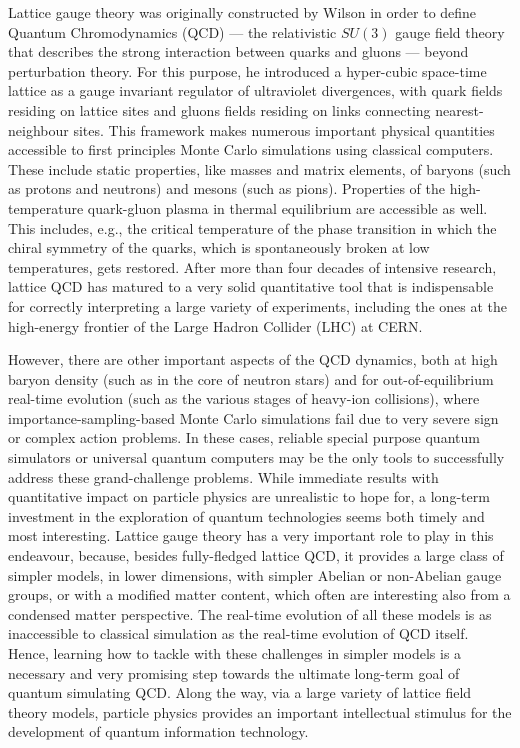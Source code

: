 \documentclass[epj,final]{svjour}
\begin{document}
Lattice gauge theory was originally constructed by Wilson in order to define Quantum Chromodynamics (QCD) --- the relativistic $SU(3)$ gauge field theory that describes the strong interaction between quarks and gluons --- beyond perturbation theory. For this purpose, he introduced a hyper-cubic space-time lattice as a gauge invariant regulator of ultraviolet divergences, with quark fields residing on lattice sites and gluons fields residing on links connecting nearest-neighbour sites. This framework makes numerous important physical quantities accessible to first principles Monte Carlo simulations using classical computers. These include static properties, like masses and matrix elements, of baryons (such as protons and neutrons) and mesons (such as pions). Properties of the high-temperature quark-gluon plasma in thermal equilibrium are accessible as well. This includes, e.g., the critical temperature of the phase transition in which the chiral symmetry of the quarks, which is spontaneously broken at low temperatures, gets restored. After more than four decades of intensive research, lattice QCD has matured to a very solid quantitative tool that is indispensable for correctly interpreting a large variety of experiments, including the ones at the high-energy frontier of the Large Hadron Collider (LHC) at CERN. 

However, there are other important aspects of the QCD dynamics, both at high baryon density (such as in the core of neutron stars) and for out-of-equilibrium real-time evolution (such as the various stages of heavy-ion collisions), where importance-sampling-based Monte Carlo simulations fail due to very severe sign or complex action problems. In these cases, reliable special purpose quantum simulators or universal quantum computers may be the only tools to successfully address these grand-challenge problems. While immediate results with quantitative impact on particle physics are unrealistic to hope for, a long-term investment in the exploration of quantum technologies seems both timely and most interesting. Lattice gauge theory has a very important role to play in this endeavour, because, besides fully-fledged lattice QCD, it provides a large class of simpler models, in lower dimensions, with simpler Abelian or non-Abelian gauge groups, or with a modified matter content, which often are interesting also from a condensed matter perspective. The real-time evolution of all these models is as inaccessible to classical simulation as the real-time evolution of QCD itself. Hence, learning how to tackle with these challenges in simpler models is a necessary and very promising step towards the ultimate long-term goal of quantum simulating QCD. Along the way, via a large variety of lattice field theory models, particle physics provides an important intellectual stimulus for the development of quantum information technology.
\end{document}
